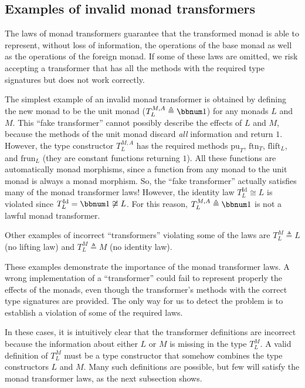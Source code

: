 \subsection{Examples of invalid monad transformers}

The laws of monad transformers guarantee that the transformed monad
is able to represent, without loss of information, the operations
of the base monad as well as the operations of the foreign monad.
If some of these laws are omitted, we risk accepting a transformer
that has all the methods with the required type signatures but does
not work correctly.

The simplest example of an invalid monad transformer is obtained by
defining the new monad to be the unit monad ($T_{L}^{M,A}\triangleq\bbnum 1$)
for any monads $L$ and $M$. This \textsf{``}fake transformer\textsf{''} cannot possibly
describe the effects of $L$ and $M$, because the methods of the
unit monad discard \emph{all} information and return $1$. However,
the type constructor $T_{L}^{M,A}$ has the required methods $\text{pu}_{T}$,
$\text{ftn}_{T}$, $\text{flift}_{L}$, and $\text{frun}_{L}$ (they
are constant functions returning $1$). All these functions are automatically
monad morphisms, since a function from any monad to the unit monad
is always a monad morphism. So, the \textsf{``}fake transformer\textsf{''} actually
satisfies many of the monad transformer laws! However, the identity
law $T_{L}^{\text{Id}}\cong L$ is violated since $T_{L}^{\text{Id}}=\bbnum 1\not\cong L$.
For this reason, $T_{L}^{M,A}\triangleq\bbnum 1$ is not a lawful
monad transformer.

Other examples of incorrect \textsf{``}transformers\textsf{''} violating some of the
laws are $T_{L}^{M}\triangleq L$ (no lifting law) and $T_{L}^{M}\triangleq M$
(no identity law).

These examples demonstrate the importance of the monad transformer
laws. A wrong implementation of a \textsf{``}transformer\textsf{''} could fail to
represent properly the effects of the monads, even though the transformer\textsf{'}s
methods with the correct type signatures are provided. The only way
for us to detect the problem is to establish a violation of some of
the required laws.

In these cases, it is intuitively clear that the transformer definitions
are incorrect because the information about either $L$ or $M$ is
missing in the type $T_{L}^{M}$. A valid definition of $T_{L}^{M}$
must be a type constructor that somehow combines the type constructors
$L$ and $M$. Many such definitions are possible, but few will satisfy
the monad transformer laws, as the next subsection shows.

